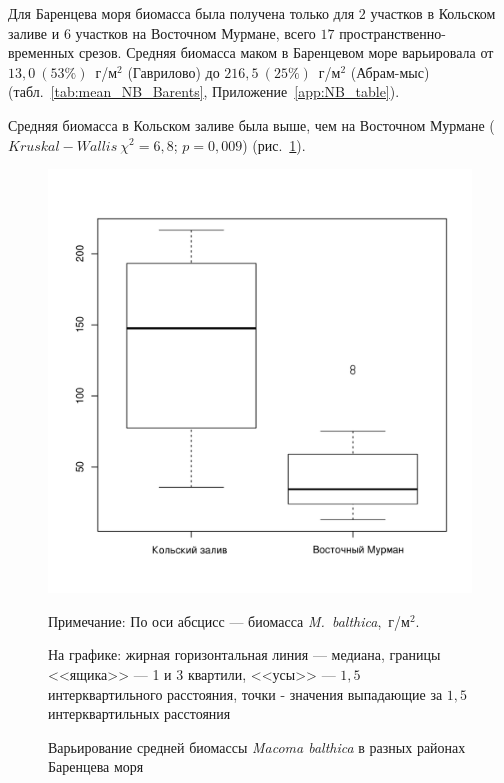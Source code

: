 Для Баренцева моря биомасса была получена только для $2$ участков в Кольском заливе и $6$ участков на Восточном Мурмане, всего $17$ про\-стран\-ствен\-но-вре\-мен\-ных срезов. 
Средняя биомасса маком в Баренцевом море варьировала от $13,0~(53\%)$~г/м$^2$ (Гаврилово) до $216,5~(25\%)$~г/м$^2$ (Абрам-мыс) (табл.~\ref{tab:mean_NB_Barents}, Приложение~\ref{app:NB_table}).

Средняя биомасса в Кольском заливе была выше, чем на Восточном Мурмане ($Kruskal-Wallis~\chi^2 = 6,8$; $p = 0,009$) (рис.~\ref{ris:B_region_Barents}).
	\begin{figure}[p]
	\begin{center}	
		\includegraphics[height=0.5\textheight]{../All_B/Bmean_region_Barents1.pdf}
	\end{center}
	\caption{Варьирование средней биомассы {\it Macoma balthica} в разных районах Баренцева моря}
	{\footnotesize Примечание: По оси абсцисс --- биомасса {\it M.~balthica},~г/м$^2$.

	На графике: жирная горизонтальная линия --- медиана, границы <<ящика>> --- 1 и 3 квартили, <<усы>> --- $1,5$ интерквартильного расстояния, точки - значения выпадающие за $1,5$ интерквартильных расстояния}
	\label{ris:B_region_Barents}
	\end{figure}


\afterpage{\clearpage}

